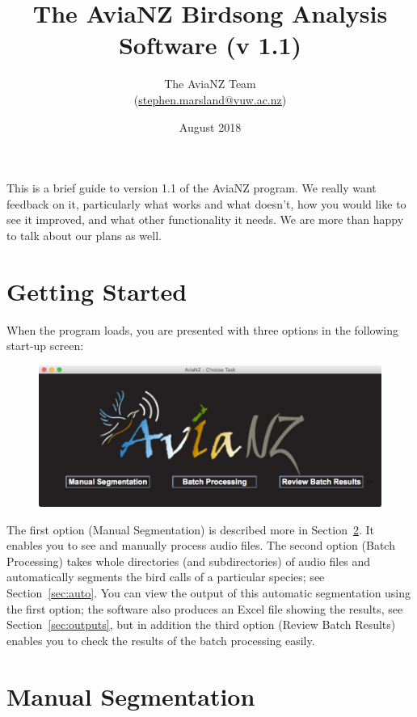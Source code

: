 \documentclass{article}
\title{The AviaNZ Birdsong Analysis Software (v 1.1)}
\author{The AviaNZ Team \\(\url{stephen.marsland@vuw.ac.nz})}
\date{August 2018}
\begin{document}
\maketitle



This is a brief guide to version 1.1 of the AviaNZ program. 
We really want feedback on it, particularly what works and what doesn't, how you would like to see it improved, and what other functionality it needs. We are more than happy to talk about our plans as well. 


\section{Getting Started}

When the program loads, you are presented with three options in the following start-up screen:

\begin{figure}[h!]
\centering
\includegraphics[width=.3\textwidth]{Figs/splashscreen}
\label{welcome}
\end{figure}

The first option (Manual Segmentation) is described more in Section~\ref{sec:manual}. It enables you to see and manually process audio files. The second option (Batch Processing) takes whole directories (and subdirectories) of audio files and automatically segments the bird calls of a particular species; see Section~\ref{sec:auto}. You can view the output of this automatic segmentation using the first option; the software also produces an Excel file showing the results, see Section~\ref{sec:outputs}, but in addition the third option (Review Batch Results) enables you to check the results of the batch processing easily. 

\section{Manual Segmentation}
\label{sec:manual}
\end{document}
